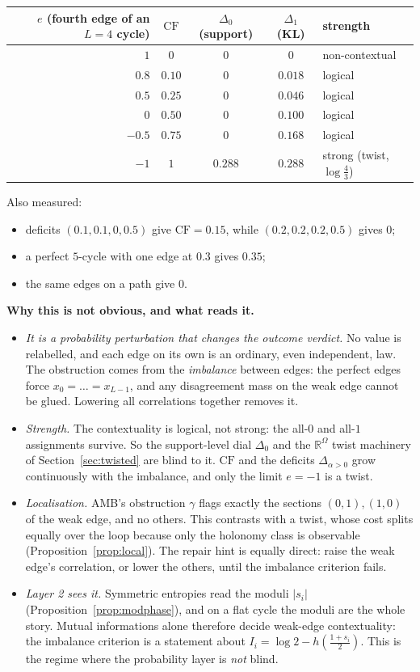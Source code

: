 \documentclass[11pt]{article}
\theoremstyle{definition}
\theoremstyle{remark}
\newcommand{\R}{\mathbb{R}}
\newcommand{\CF}{\mathrm{CF}}
\begin{document}
\begin{center}\small
\begin{tabular}{rcccl}
\hline
$e$ (fourth edge of an $L=4$ cycle) & $\CF$ & $\Delta_0$ (support) & $\Delta_1$ (KL) & strength\\
\hline
$1$ & $0$ & $0$ & $0$ & non-contextual\\
$0.8$ & $0.10$ & $0$ & $0.018$ & logical\\
$0.5$ & $0.25$ & $0$ & $0.046$ & logical\\
$0$ & $0.50$ & $0$ & $0.100$ & logical\\
$-0.5$ & $0.75$ & $0$ & $0.168$ & logical\\
$-1$ & $1$ & $0.288$ & $0.288$ & strong (twist, $\log\tfrac43$)\\
\hline
\end{tabular}
\end{center}
Also measured:
\begin{itemize}
  \item deficits $(0.1,0.1,0,0.5)$ give $\CF=0.15$, while $(0.2,0.2,0.2,0.5)$ gives $0$;
  \item a perfect $5$-cycle with one edge at $0.3$ gives $0.35$;
  \item the same edges on a path give $0$.
\end{itemize}

\textbf{Why this is not obvious, and what reads it.}
\begin{itemize}
  \item \emph{It is a probability perturbation that changes the outcome verdict.} No value is relabelled, and each edge on its own is an ordinary, even independent, law. The obstruction comes from the \emph{imbalance} between edges: the perfect edges force $x_0=\dots=x_{L-1}$, and any disagreement mass on the weak edge cannot be glued. Lowering all correlations together removes it.
  \item \emph{Strength.} The contextuality is logical, not strong: the all-$0$ and all-$1$ assignments survive. So the support-level dial $\Delta_0$ and the $\R^\Omega$ twist machinery of Section~\ref{sec:twisted} are blind to it. $\CF$ and the deficits $\Delta_{\alpha>0}$ grow continuously with the imbalance, and only the limit $e=-1$ is a twist.
  \item \emph{Localisation.} AMB's obstruction $\gamma$ flags exactly the sections $(0,1),(1,0)$ of the weak edge, and no others. This contrasts with a twist, whose cost splits equally over the loop because only the holonomy class is observable (Proposition~\ref{prop:local}). The repair hint is equally direct: raise the weak edge's correlation, or lower the others, until the imbalance criterion fails.
  \item \emph{Layer 2 sees it.} Symmetric entropies read the moduli $|s_i|$ (Proposition~\ref{prop:modphase}), and on a flat cycle the moduli are the whole story. Mutual informations alone therefore decide weak-edge contextuality: the imbalance criterion is a statement about $I_i=\log2-h(\tfrac{1+s_i}2)$. This is the regime where the probability layer is \emph{not} blind.
\end{itemize}
\end{document}
